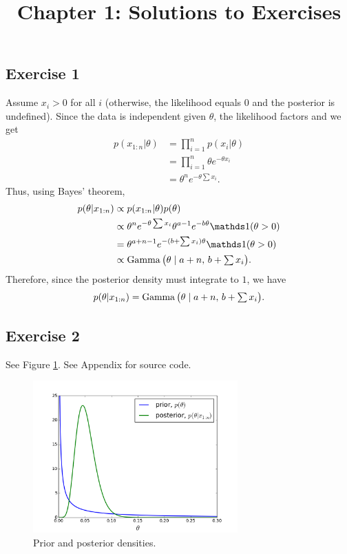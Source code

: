 \documentclass[12pt]{article}
\title{Chapter 1: Solutions to Exercises}
\author{}
\date{}
\begin{document}
\maketitle
\thispagestyle{firststyle}

\subsection*{Exercise 1}

Assume $x_i>0$ for all $i$ (otherwise, the likelihood equals $0$ and the posterior is undefined).
Since the data is independent given $\theta$, the likelihood factors and we get
\begin{align*}
p(x_{1:n}|\theta) & = \prod_{i = 1}^n p(x_i|\theta) \\
& = \prod_{i = 1}^n \theta e^{-\theta x_i} \\
& = \theta^n e^{-\theta\sum x_i}.
\end{align*}
Thus, using Bayes' theorem,
\begin{align*}
p(\theta|x_{1:n}) &\propto p(x_{1:n}|\theta) p(\theta) \\
& \propto \theta^n e^{-\theta\sum x_i} \theta^{a-1} e^{-b\theta}\I(\theta>0) \\
& = \theta^{a+n-1} e^{-(b+\sum x_i)\theta}\I(\theta>0)\\
&\propto \Ga\big(\theta\mid a+n,\,b+\textstyle\sum x_i\big).
\end{align*}
Therefore, since the posterior density must integrate to $1$, we have
$$p(\theta|x_{1:n}) =\operatorname*{Gamma}\big(\theta\mid a+n,\,b+\textstyle\sum x_i\big).$$


\subsection*{Exercise 2}

See Figure \ref{figure:posterior}. See Appendix for source code.

\begin{figure}
  \begin{center}
    \includegraphics[width=0.7\textwidth]{homework.png}
  \end{center}
  \caption{Prior and posterior densities.}
  \label{figure:posterior}
\end{figure}
\end{document}
